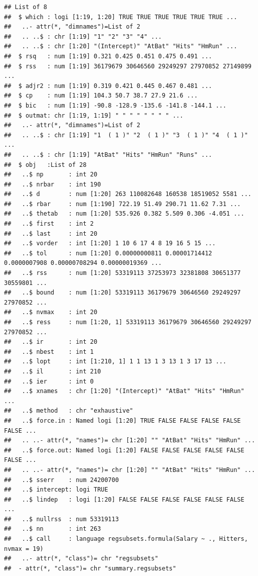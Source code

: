 \documentclass[
  12pt,
]{book}
\theoremstyle{definition}
\theoremstyle{definition}
\theoremstyle{definition}
\theoremstyle{definition}
\theoremstyle{remark}
\begin{document}
\begin{verbatim}
## List of 8
##  $ which : logi [1:19, 1:20] TRUE TRUE TRUE TRUE TRUE TRUE ...
##   ..- attr(*, "dimnames")=List of 2
##   .. ..$ : chr [1:19] "1" "2" "3" "4" ...
##   .. ..$ : chr [1:20] "(Intercept)" "AtBat" "Hits" "HmRun" ...
##  $ rsq   : num [1:19] 0.321 0.425 0.451 0.475 0.491 ...
##  $ rss   : num [1:19] 36179679 30646560 29249297 27970852 27149899 ...
##  $ adjr2 : num [1:19] 0.319 0.421 0.445 0.467 0.481 ...
##  $ cp    : num [1:19] 104.3 50.7 38.7 27.9 21.6 ...
##  $ bic   : num [1:19] -90.8 -128.9 -135.6 -141.8 -144.1 ...
##  $ outmat: chr [1:19, 1:19] " " " " " " " " ...
##   ..- attr(*, "dimnames")=List of 2
##   .. ..$ : chr [1:19] "1  ( 1 )" "2  ( 1 )" "3  ( 1 )" "4  ( 1 )" ...
##   .. ..$ : chr [1:19] "AtBat" "Hits" "HmRun" "Runs" ...
##  $ obj   :List of 28
##   ..$ np       : int 20
##   ..$ nrbar    : int 190
##   ..$ d        : num [1:20] 263 110082648 160538 18519052 5581 ...
##   ..$ rbar     : num [1:190] 722.19 51.49 290.71 11.62 7.31 ...
##   ..$ thetab   : num [1:20] 535.926 0.382 5.509 0.306 -4.051 ...
##   ..$ first    : int 2
##   ..$ last     : int 20
##   ..$ vorder   : int [1:20] 1 10 6 17 4 8 19 16 5 15 ...
##   ..$ tol      : num [1:20] 0.00000000811 0.00001714412 0.0000007908 0.00000708294 0.00000019369 ...
##   ..$ rss      : num [1:20] 53319113 37253973 32381808 30651377 30559801 ...
##   ..$ bound    : num [1:20] 53319113 36179679 30646560 29249297 27970852 ...
##   ..$ nvmax    : int 20
##   ..$ ress     : num [1:20, 1] 53319113 36179679 30646560 29249297 27970852 ...
##   ..$ ir       : int 20
##   ..$ nbest    : int 1
##   ..$ lopt     : int [1:210, 1] 1 1 13 1 3 13 1 3 17 13 ...
##   ..$ il       : int 210
##   ..$ ier      : int 0
##   ..$ xnames   : chr [1:20] "(Intercept)" "AtBat" "Hits" "HmRun" ...
##   ..$ method   : chr "exhaustive"
##   ..$ force.in : Named logi [1:20] TRUE FALSE FALSE FALSE FALSE FALSE ...
##   .. ..- attr(*, "names")= chr [1:20] "" "AtBat" "Hits" "HmRun" ...
##   ..$ force.out: Named logi [1:20] FALSE FALSE FALSE FALSE FALSE FALSE ...
##   .. ..- attr(*, "names")= chr [1:20] "" "AtBat" "Hits" "HmRun" ...
##   ..$ sserr    : num 24200700
##   ..$ intercept: logi TRUE
##   ..$ lindep   : logi [1:20] FALSE FALSE FALSE FALSE FALSE FALSE ...
##   ..$ nullrss  : num 53319113
##   ..$ nn       : int 263
##   ..$ call     : language regsubsets.formula(Salary ~ ., Hitters, nvmax = 19)
##   ..- attr(*, "class")= chr "regsubsets"
##  - attr(*, "class")= chr "summary.regsubsets"
\end{verbatim}
\end{document}

